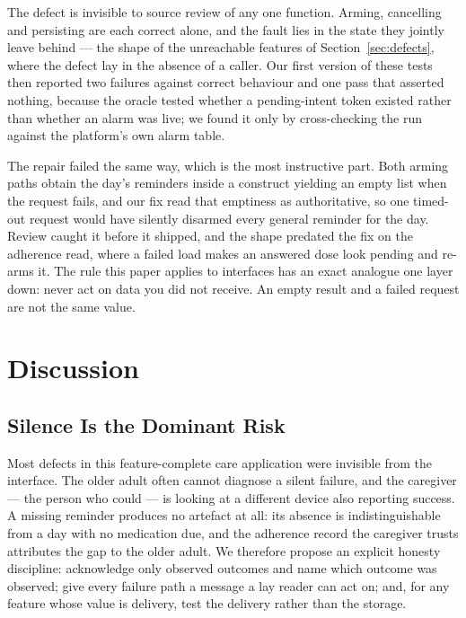 \documentclass[runningheads,a4paper]{llncs}
\begin{document}
The defect is invisible to source review of any one function. Arming, cancelling and
persisting are each correct alone, and the fault lies in the state they jointly leave
behind --- the shape of the unreachable features of Section~\ref{sec:defects}, where the
defect lay in the absence of a caller. Our first version of these tests then reported two
failures against correct behaviour and one pass that asserted nothing, because the oracle
tested whether a pending-intent token existed rather than whether an alarm was live; we
found it only by cross-checking the run against the platform's own alarm table.

The repair failed the same way, which is the most instructive part. Both arming paths obtain
the day's reminders inside a construct yielding an empty list when the request fails, and
our fix read that emptiness as authoritative, so one timed-out request would have silently
disarmed every general reminder for the day. Review caught it before it shipped, and the
shape predated the fix on the adherence read, where a failed load makes an answered dose
look pending and re-arms it. The rule this paper applies to interfaces has an exact analogue
one layer down: never act on data you did not receive. An empty result and a failed request
are not the same value.

\section{Discussion}

\subsection{Silence Is the Dominant Risk}
Most defects in this feature-complete care application were invisible from the interface.
The older adult often cannot diagnose a silent failure, and the caregiver --- the person who
could --- is looking at a different device also reporting success. A missing reminder produces no artefact at
all: its absence is indistinguishable from a day with no medication due, and the adherence
record the caregiver trusts attributes the gap to the older adult. We therefore propose an
explicit honesty discipline: acknowledge only observed outcomes and name which outcome was
observed; give every failure path a message a lay reader can act on; and, for any feature
whose value is delivery, test the delivery rather than the storage.
\end{document}
